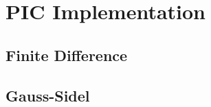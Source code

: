 \section{PIC Implementation}


\subsection{Finite Difference}
\label{sec:finite_diff}


\subsection{Gauss-Sidel}
\label{sec:gauss}

